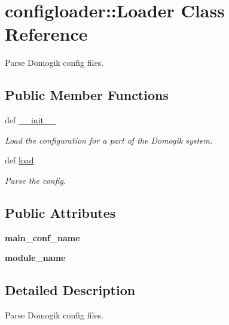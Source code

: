 \hypertarget{classconfigloader_1_1Loader}{
\section{configloader::Loader Class Reference}
\label{classconfigloader_1_1Loader}
}
Parse Domogik config files.  


\subsection*{Public Member Functions}
\begin{CompactItemize}
\item 
def \hyperlink{classconfigloader_1_1Loader_f16abb85a49b17461dcc647f4a2d5e00}{\_\-\_\-init\_\-\_\-}
\begin{CompactList}\small\item\em Load the configuration for a part of the Domogik system. \item\end{CompactList}\item 
def \hyperlink{classconfigloader_1_1Loader_52f1433b0ea290e45661b7473c3a68d4}{load}
\begin{CompactList}\small\item\em Parse the config. \item\end{CompactList}\end{CompactItemize}
\subsection*{Public Attributes}
\begin{CompactItemize}
\item 
\hypertarget{classconfigloader_1_1Loader_1a7a816df2d21c388cbb544c79caa065}{
\textbf{main\_\-conf\_\-name}}
\label{classconfigloader_1_1Loader_1a7a816df2d21c388cbb544c79caa065}

\item 
\hypertarget{classconfigloader_1_1Loader_44604dd7b77716499655a4f39453a13d}{
\textbf{module\_\-name}}
\label{classconfigloader_1_1Loader_44604dd7b77716499655a4f39453a13d}

\end{CompactItemize}


\subsection{Detailed Description}
Parse Domogik config files. 

